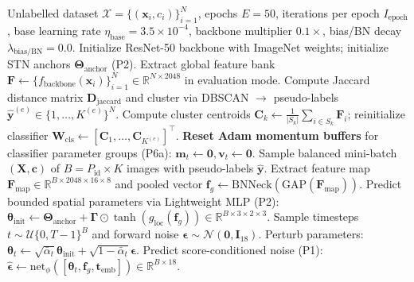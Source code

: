 \begin{algorithm}[ht]
\scriptsize
\caption{End-to-End PISL Training Pipeline with Optimizations P1--P6}
\label{alg:pisl_optimized_training}
\begin{algorithmic}[1]
\Require Unlabelled dataset $\mathcal{X} = \{(\mathbf{x}_i, c_i)\}_{i=1}^N$, epochs $E=50$, iterations per epoch $I_{\text{epoch}}$, base learning rate $\eta_{\text{base}} = 3.5 \times 10^{-4}$, backbone multiplier $0.1\times$, bias/BN decay $\lambda_{\text{bias/BN}} = 0.0$.
\State Initialize ResNet-50 backbone with ImageNet weights; initialize STN anchors $\mathbf{\Theta}_{\text{anchor}}$ (P2).
    \State Extract global feature bank $\mathbf{F} \leftarrow \{f_{\text{backbone}}(\mathbf{x}_i)\}_{i=1}^N \in \mathbb{R}^{N \times 2048}$ in evaluation mode.
    \State Compute Jaccard distance matrix $\mathbf{D}_{\text{jaccard}}$ and cluster via DBSCAN $\rightarrow$ pseudo-labels $\hat{\mathbf{y}}^{(e)} \in \{1, \dots, K^{(e)}\}^N$.
    \State Compute cluster centroids $\mathbf{C}_k \leftarrow \frac{1}{|S_k|}\sum_{i \in S_k} \mathbf{F}_i$; reinitialize classifier $\mathbf{W}_{\text{cls}} \leftarrow [\mathbf{C}_1, \dots, \mathbf{C}_{K^{(e)}}]^\top$.
    \State \textbf{Reset Adam momentum buffers} for classifier parameter groups (P6a): $\mathbf{m}_t \leftarrow \mathbf{0}, \mathbf{v}_t \leftarrow \mathbf{0}$.
        \State Sample balanced mini-batch $(\mathbf{X}, \mathbf{c})$ of $B = P_{\text{id}} \times K$ images with pseudo-labels $\hat{\mathbf{y}}$.
        \State Extract feature map $\mathbf{F}_{\text{map}} \in \mathbb{R}^{B \times 2048 \times 16 \times 8}$ and pooled vector $\mathbf{f}_g \leftarrow \text{BNNeck}(\text{GAP}(\mathbf{F}_{\text{map}}))$.
        \State Predict bounded spatial parameters via Lightweight MLP (P2): $\boldsymbol{\theta}_{\text{init}} \leftarrow \mathbf{\Theta}_{\text{anchor}} + \boldsymbol{\Gamma} \odot \tanh(g_{\text{loc}}(\mathbf{f}_g)) \in \mathbb{R}^{B \times 3 \times 2 \times 3}$.
        \State Sample timesteps $t \sim \mathcal{U}\{0, T-1\}^B$ and forward noise $\boldsymbol{\epsilon} \sim \mathcal{N}(\mathbf{0}, \mathbf{I}_{18})$.
        \State Perturb parameters: $\boldsymbol{\theta}_t \leftarrow \sqrt{\bar{\alpha}_t}\boldsymbol{\theta}_{\text{init}} + \sqrt{1 - \bar{\alpha}_t}\boldsymbol{\epsilon}$.
        \State Predict score-conditioned noise (P1): $\hat{\boldsymbol{\epsilon}} \leftarrow \text{net}_\phi([\boldsymbol{\theta}_t, \mathbf{f}_g, \mathbf{t}_{\text{emb}}]) \in \mathbb{R}^{B \times 18}$.

\end{algorithmic}
\end{algorithm}
